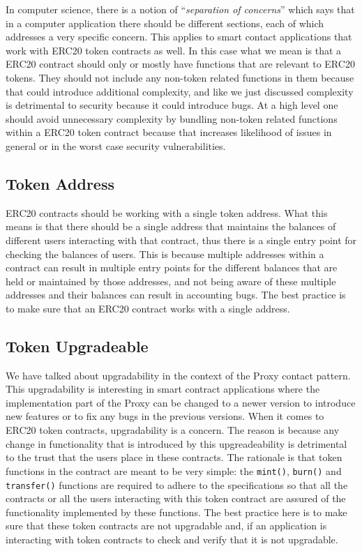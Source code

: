 In computer science, there is a notion of ``\emph{separation of
concerns}'' which says that in a computer application there should be
different sections, each of which addresses a very specific concern.
This applies to smart contact applications that work with ERC20 token
contracts as well. In this case what we mean is that a ERC20 contract
should only or mostly have functions that are relevant to ERC20 tokens.
They should not include any non-token related functions in them because
that could introduce additional complexity, and like we just discussed
complexity is detrimental to security because it could introduce bugs.
At a high level one should avoid unnecessary complexity by bundling
non-token related functions within a ERC20 token contract because that
increases likelihood of issues in general or in the worst case security
vulnerabilities.

\subsection{Token Address}\label{token-address}

ERC20 contracts should be working with a single token address. What this
means is that there should be a single address that maintains the
balances of different users interacting with that contract, thus there
is a single entry point for checking the balances of users. This is
because multiple addresses within a contract can result in multiple
entry points for the different balances that are held or maintained by
those addresses, and not being aware of these multiple addresses and
their balances can result in accounting bugs. The best practice is to
make sure that an ERC20 contract works with a single address.

\subsection{Token Upgradeable}\label{token-upgradeable}

We have talked about upgradability in the context of the Proxy contact
pattern. This upgradability is interesting in smart contract
applications where the implementation part of the Proxy can be changed
to a newer version to introduce new features or to fix any bugs in the
previous versions. When it comes to ERC20 token contracts, upgradability
is a concern. The reason is because any change in functionality that is
introduced by this upgreadeability is detrimental to the trust that the
users place in these contracts. The rationale is that token functions in
the contract are meant to be very simple: the \texttt{mint()},
\texttt{burn()} and \texttt{transfer()} functions are required to adhere
to the specifications so that all the contracts or all the users
interacting with this token contract are assured of the functionality
implemented by these functions. The best practice here is to make sure
that these token contracts are not upgradable and, if an application is
interacting with token contracts to check and verify that it is not
upgradable.

